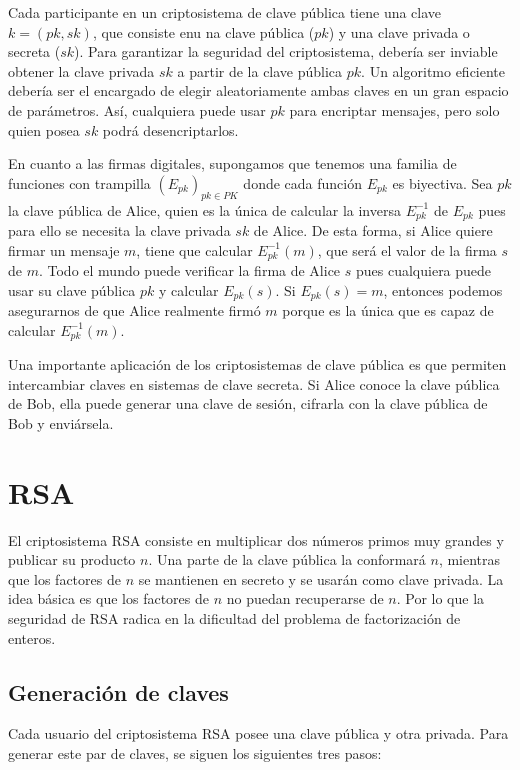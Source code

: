 Cada participante en un criptosistema de clave pública tiene una clave $k = (pk, sk)$, que consiste enu na clave pública ($pk$) y una clave privada o secreta ($sk$). Para garantizar la seguridad del criptosistema, debería ser inviable obtener la clave privada $sk$ a partir de la clave pública $pk$. Un algoritmo eficiente debería ser el encargado de elegir aleatoriamente ambas claves en un gran espacio de parámetros. Así, cualquiera puede usar $pk$ para encriptar mensajes, pero solo quien posea $sk$ podrá desencriptarlos.

En cuanto a las firmas digitales, supongamos que tenemos una familia de funciones con trampilla $\left( E_{pk} \right)_{pk \in PK}$ donde cada función $E_{pk}$ es biyectiva. Sea $pk$ la clave pública de Alice, quien es la única de calcular la inversa $E_{pk}^{-1}$ de $E_{pk}$ pues para ello se necesita la clave privada $sk$ de Alice. De esta forma, si Alice quiere firmar un mensaje $m$, tiene que calcular $E_{pk}^{-1}(m)$, que será el valor de la firma $s$ de $m$. Todo el mundo puede verificar la firma de Alice $s$ pues cualquiera puede usar su clave pública $pk$ y calcular $E_{pk}(s)$. Si $E_{pk} (s) = m$, entonces podemos asegurarnos de que Alice realmente firmó $m$ porque es la única que es capaz de calcular $E_{pk}^{-1}(m)$.

Una importante aplicación de los criptosistemas de clave pública es que permiten intercambiar claves en sistemas de clave secreta. Si Alice conoce la clave pública de Bob, ella puede generar una clave de sesión, cifrarla con la clave pública de Bob y enviársela.  

\section{RSA}

El criptosistema RSA consiste en multiplicar dos números primos muy grandes y publicar su producto $n$. Una parte de la clave pública la conformará $n$, mientras que los factores de $n$ se mantienen en secreto y se usarán como clave privada. La idea básica es que los factores de $n$ no puedan recuperarse de $n$. Por lo que la seguridad de RSA radica en la dificultad del problema de factorización de enteros.

\subsection{Generación de claves}

Cada usuario del criptosistema RSA posee una clave pública y otra privada. Para generar este par de claves, se siguen los siguientes tres pasos:

